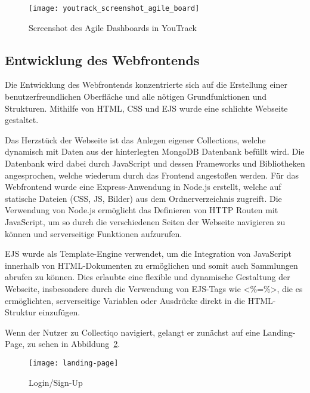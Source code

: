 \begin{figure}[h]
    \centering
    \texttt{[image: youtrack\_screenshot\_agile\_board]}
    \caption{Screenshot des Agile Dashboards in YouTrack}
    \label{fig:youtrack_screenshot_agile_board}
\end{figure}

\subsection{Entwicklung des Webfrontends}\label{subsec:entwicklung-des-webfrontends}
Die Entwicklung des Webfrontends konzentrierte sich auf die Erstellung einer benutzerfreundlichen Oberfläche und alle nötigen Grundfunktionen und Strukturen.
Mithilfe von HTML, CSS und EJS wurde eine schlichte Webseite gestaltet.

Das Herzstück der Webseite ist das Anlegen eigener Collections, welche dynamisch mit Daten aus der hinterlegten MongoDB Datenbank befüllt wird.
Die Datenbank wird dabei durch JavaScript und dessen Frameworks und Bibliotheken angesprochen, welche wiederum durch das Frontend angestoßen werden.
Für das Webfrontend wurde eine Express-Anwendung in Node.js erstellt, welche auf statische Dateien (CSS, JS, Bilder) aus dem Ordnerverzeichnis zugreift.
Die Verwendung von Node.js ermöglicht das Definieren von HTTP Routen mit JavaScript, um so durch die verschiedenen Seiten der Webseite navigieren zu können und serverseitige Funktionen aufzurufen.

EJS wurde als Template-Engine verwendet, um die Integration von JavaScript innerhalb von HTML-Dokumenten zu ermöglichen und somit auch Sammlungen abrufen zu können.
Dies erlaubte eine flexible und dynamische Gestaltung der Webseite, insbesondere durch die Verwendung von EJS-Tags wie \grqq\textless{}\%=\%\textgreater{}\grqq{}, die es ermöglichten, serverseitige Variablen oder Ausdrücke direkt in die HTML-Struktur einzufügen.

Wenn der Nutzer zu Collectiqo navigiert, gelangt er zunächst auf eine Landing-Page, zu sehen in Abbildung~\ref{fig:landing-page}.

\begin{figure}[h]
    \centering
    \texttt{[image: landing-page]}
    \caption{Login/Sign-Up}
    \label{fig:landing-page}
\end{figure}

